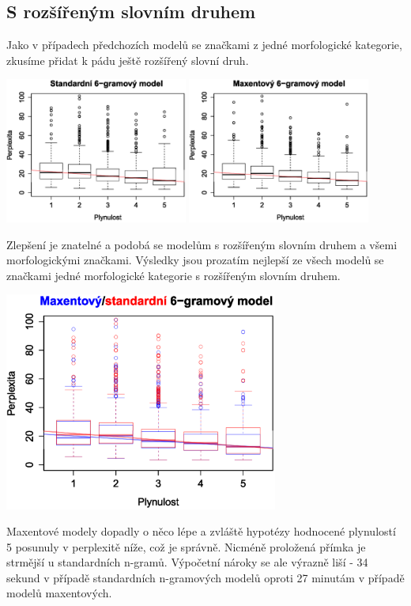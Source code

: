 \documentclass[12pt,a4paper]{report}
\begin{document}
\subsection{S rozšířeným slovním druhem}
Jako v případech předchozích modelů se značkami z jedné morfologické kategorie, zkusíme přidat k pádu ještě rozšířený slovní druh.
\begin{center}
	\includegraphics[width=60mm]{./grafy/morf/ngram/rsd+pad.svg.eps}
	\includegraphics[width=60mm]{./grafy/morf/maxent/rsd+pad.svg.eps}
\end{center}
Zlepšení je znatelné a podobá se modelům s rozšířeným slovním druhem a všemi morfologickými značkami. Výsledky jsou prozatím nejlepší ze všech modelů se značkami jedné morfologické kategorie s rozšířeným slovním druhem.
\begin{center}
	\includegraphics[width=90mm]{./grafy/morf/porovnani/rsd+pad.eps}	
\end{center}
Maxentové modely dopadly o něco lépe a zvláště hypotézy hodnocené plynulostí 5 posunuly v perplexitě níže, což je správně. Nicméně proložená přímka je strmější u standardních n-gramů. Výpočetní nároky se ale výrazně liší - 34 sekund v případě standardních n-gramových modelů oproti 27 minutám v případě modelů maxentových.
\end{document}
